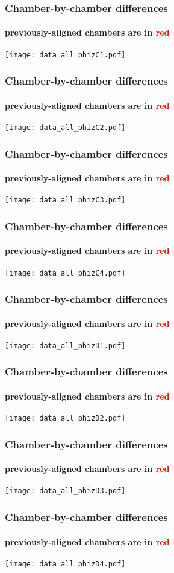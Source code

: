 \documentclass[compress]{beamer}
\begin{document}
\begin{frame}
\frametitle{Chamber-by-chamber differences}
\framesubtitle{previously-aligned chambers are in \textcolor{red}{red}}
\texttt{[image: data\_all\_phizC1.pdf]}
\end{frame}

\begin{frame}
\frametitle{Chamber-by-chamber differences}
\framesubtitle{previously-aligned chambers are in \textcolor{red}{red}}
\texttt{[image: data\_all\_phizC2.pdf]}
\end{frame}

\begin{frame}
\frametitle{Chamber-by-chamber differences}
\framesubtitle{previously-aligned chambers are in \textcolor{red}{red}}
\texttt{[image: data\_all\_phizC3.pdf]}
\end{frame}

\begin{frame}
\frametitle{Chamber-by-chamber differences}
\framesubtitle{previously-aligned chambers are in \textcolor{red}{red}}
\texttt{[image: data\_all\_phizC4.pdf]}
\end{frame}

\begin{frame}
\frametitle{Chamber-by-chamber differences}
\framesubtitle{previously-aligned chambers are in \textcolor{red}{red}}
\texttt{[image: data\_all\_phizD1.pdf]}
\end{frame}

\begin{frame}
\frametitle{Chamber-by-chamber differences}
\framesubtitle{previously-aligned chambers are in \textcolor{red}{red}}
\texttt{[image: data\_all\_phizD2.pdf]}
\end{frame}

\begin{frame}
\frametitle{Chamber-by-chamber differences}
\framesubtitle{previously-aligned chambers are in \textcolor{red}{red}}
\texttt{[image: data\_all\_phizD3.pdf]}
\end{frame}

\begin{frame}
\frametitle{Chamber-by-chamber differences}
\framesubtitle{previously-aligned chambers are in \textcolor{red}{red}}
\texttt{[image: data\_all\_phizD4.pdf]}
\end{frame}
\end{document}
